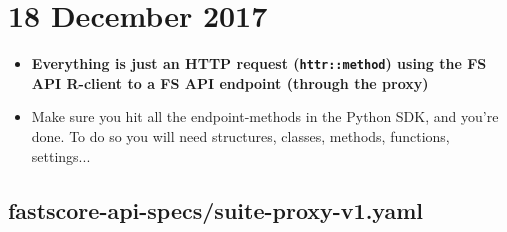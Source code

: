 \documentclass{article}
\begin{document}
\section*{18 December 2017}

\begin{itemize}
\item {\bf Everything is just an HTTP request (\verb|httr::method|) using the FS API R-client to a FS API endpoint (through the proxy)}
\item Make sure you hit all the endpoint-methods in the Python SDK, and you're done. To do so you will need structures, classes, methods, functions, settings...
\end{itemize}

\subsection*{fastscore-api-specs/suite-proxy-v1.yaml}
\end{document}
